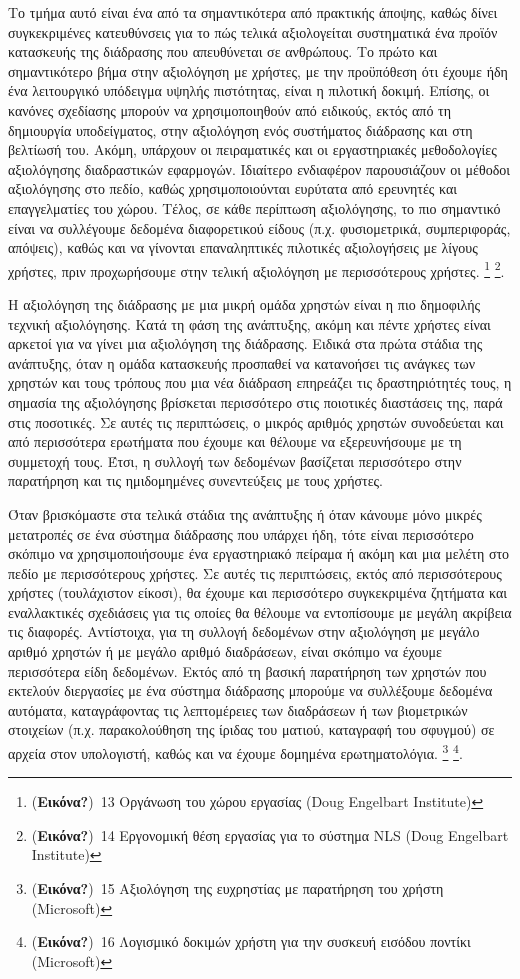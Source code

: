 \documentclass[
]{article}
\begin{document}
Το τμήμα αυτό είναι ένα από τα σημαντικότερα από πρακτικής άποψης, καθώς
δίνει συγκεκριμένες κατευθύνσεις για το πώς τελικά αξιολογείται
συστηματικά ένα προϊόν κατασκευής της διάδρασης που απευθύνεται σε
ανθρώπους. Το πρώτο και σημαντικότερο βήμα στην αξιολόγηση με χρήστες,
με την προϋπόθεση ότι έχουμε ήδη ένα λειτουργικό υπόδειγμα υψηλής
πιστότητας, είναι η πιλοτική δοκιμή. Επίσης, οι κανόνες σχεδίασης
μπορούν να χρησιμοποιηθούν από ειδικούς, εκτός από τη δημιουργία
υποδείγματος, στην αξιολόγηση ενός συστήματος διάδρασης και στη βελτίωσή
του. Ακόμη, υπάρχουν οι πειραματικές και οι εργαστηριακές μεθοδολογίες
αξιολόγησης διαδραστικών εφαρμογών. Ιδιαίτερο ενδιαφέρον παρουσιάζουν οι
μέθοδοι αξιολόγησης στο πεδίο, καθώς χρησιμοποιούνται ευρύτατα από
ερευνητές και επαγγελματίες του χώρου. Τέλος, σε κάθε περίπτωση
αξιολόγησης, το πιο σημαντικό είναι να συλλέγουμε δεδομένα διαφορετικού
είδους (π.χ. φυσιομετρικά, συμπεριφοράς, απόψεις), καθώς και να γίνονται
επαναληπτικές πιλοτικές αξιολογήσεις με λίγους χρήστες, πριν
προχωρήσουμε στην τελική αξιολόγηση με περισσότερους χρήστες.
\footnote{(\textbf{Εικόνα?})~13 Οργάνωση του χώρου εργασίας (Doug
  Engelbart Institute)} \footnote{(\textbf{Εικόνα?})~14 Εργονομική θέση
  εργασίας για το σύστημα NLS (Doug Engelbart Institute)}.

Η αξιολόγηση της διάδρασης με μια μικρή ομάδα χρηστών είναι η πιο
δημοφιλής τεχνική αξιολόγησης. Κατά τη φάση της ανάπτυξης, ακόμη και
πέντε χρήστες είναι αρκετοί για να γίνει μια αξιολόγηση της διάδρασης.
Ειδικά στα πρώτα στάδια της ανάπτυξης, όταν η ομάδα κατασκευής προσπαθεί
να κατανοήσει τις ανάγκες των χρηστών και τους τρόπους που μια νέα
διάδραση επηρεάζει τις δραστηριότητές τους, η σημασία της αξιολόγησης
βρίσκεται περισσότερο στις ποιοτικές διαστάσεις της, παρά στις
ποσοτικές. Σε αυτές τις περιπτώσεις, ο μικρός αριθμός χρηστών
συνοδεύεται και από περισσότερα ερωτήματα που έχουμε και θέλουμε να
εξερευνήσουμε με τη συμμετοχή τους. Έτσι, η συλλογή των δεδομένων
βασίζεται περισσότερο στην παρατήρηση και τις ημιδομημένες συνεντεύξεις
με τους χρήστες.

Όταν βρισκόμαστε στα τελικά στάδια της ανάπτυξης ή όταν κάνουμε μόνο
μικρές μετατροπές σε ένα σύστημα διάδρασης που υπάρχει ήδη, τότε είναι
περισσότερο σκόπιμο να χρησιμοποιήσουμε ένα εργαστηριακό πείραμα ή ακόμη
και μια μελέτη στο πεδίο με περισσότερους χρήστες. Σε αυτές τις
περιπτώσεις, εκτός από περισσότερους χρήστες (τουλάχιστον είκοσι), θα
έχουμε και περισσότερο συγκεκριμένα ζητήματα και εναλλακτικές σχεδιάσεις
για τις οποίες θα θέλουμε να εντοπίσουμε με μεγάλη ακρίβεια τις
διαφορές. Αντίστοιχα, για τη συλλογή δεδομένων στην αξιολόγηση με μεγάλο
αριθμό χρηστών ή με μεγάλο αριθμό διαδράσεων, είναι σκόπιμο να έχουμε
περισσότερα είδη δεδομένων. Εκτός από τη βασική παρατήρηση των χρηστών
που εκτελούν διεργασίες με ένα σύστημα διάδρασης μπορούμε να συλλέξουμε
δεδομένα αυτόματα, καταγράφοντας τις λεπτομέρειες των διαδράσεων ή των
βιομετρικών στοιχείων (π.χ. παρακολούθηση της ίριδας του ματιού,
καταγραφή του σφυγμού) σε αρχεία στον υπολογιστή, καθώς και να έχουμε
δομημένα ερωτηματολόγια. \footnote{(\textbf{Εικόνα?})~15 Αξιολόγηση της
  ευχρηστίας με παρατήρηση του χρήστη (Microsoft)} \footnote{(\textbf{Εικόνα?})~16
  Λογισμικό δοκιμών χρήστη για την συσκευή εισόδου ποντίκι (Microsoft)}.
\end{document}
